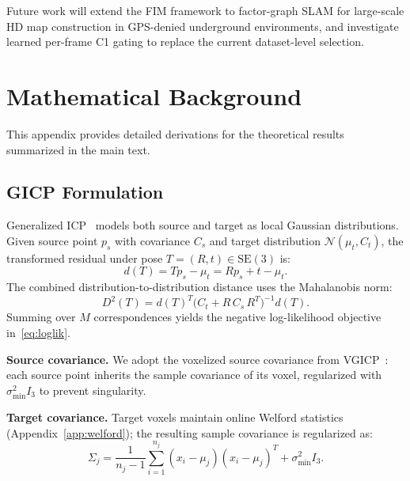 \documentclass[journal,letterpaper,10pt]{IEEEtran}
\newcommand{\SE}{\mathrm{SE}(3)}
\begin{document}
Future work will extend the FIM framework to
factor-graph SLAM for large-scale HD map construction
in GPS-denied underground environments, and investigate
learned per-frame C1 gating to replace the current
dataset-level selection.

\appendix

\section{Mathematical Background}\label{app:math}

This appendix provides detailed derivations for the theoretical
results summarized in the main text.

\subsection{GICP Formulation}\label{app:gicp}

Generalized ICP~\cite{segal2009generalized} models both source and target
as local Gaussian distributions. Given source point $p_s$ with covariance
$C_s$ and target distribution $\mathcal{N}(\mu_t, C_t)$, the transformed
residual under pose $T = (R, t) \in \SE$ is:
\begin{equation}
  d(T) = Tp_s - \mu_t = Rp_s + t - \mu_t.
  \label{eq:app_residual}
\end{equation}
The combined distribution-to-distribution distance uses the Mahalanobis norm:
\begin{equation}
  D^2(T) = d(T)^T \bigl(C_t + R\,C_s\,R^T\bigr)^{-1} d(T).
  \label{eq:app_mahal}
\end{equation}
Summing over $M$ correspondences yields the negative log-likelihood
objective in~\eqref{eq:loglik}.

\textbf{Source covariance.}
We adopt the voxelized source covariance from VGICP~\cite{koide2021voxel}:
each source point inherits the sample covariance of its voxel,
regularized with $\sigma_{\min}^2 I_3$ to prevent singularity.

\textbf{Target covariance.}
Target voxels maintain online Welford statistics (Appendix~\ref{app:welford});
the resulting sample covariance is regularized as:
\begin{equation}
  \Sigma_j = \frac{1}{n_j - 1}\sum_{i=1}^{n_j}(x_i - \mu_j)(x_i - \mu_j)^T
  + \sigma_{\min}^2 I_3.
  \label{eq:app_target_cov}
\end{equation}
\end{document}
